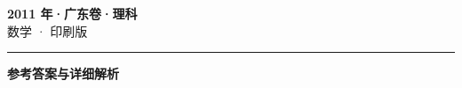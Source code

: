 \documentclass[zihao=5, a4paper]{ctexart}
\begin{document}
\begin{center}
  {\Large\bfseries 2011 年·广东卷·理科}\\[4pt]
  {\large 数学 · 印刷版}
\end{center}
\medskip
{}

\par\bigskip\hrule\bigskip
{}
\begin{center}{\large\bfseries 参考答案与详细解析}\end{center}
\smallskip

\end{document}
